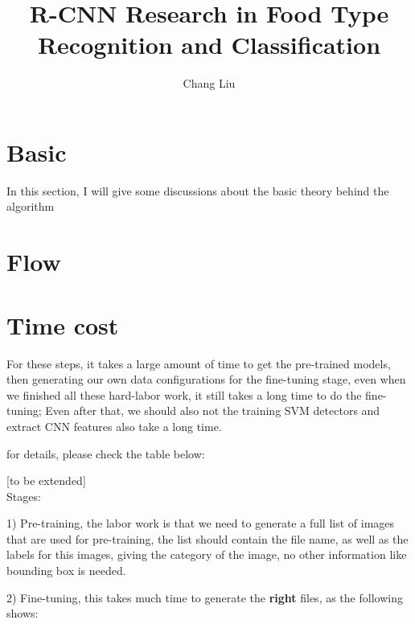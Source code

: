 \documentclass[a4]{article}
\title{R-CNN Research in Food Type Recognition and Classification}
\author{Chang Liu}
\begin{document}
\maketitle

\tableofcontents

\newpage



\section{Basic}

In this section, I will give some discussions about the basic theory behind the algorithm 


\section{Flow}



\section{Time cost}
For these steps, it takes a large amount of time to get the pre-trained models, then generating our own data configurations for the fine-tuning stage, even when we finished all these hard-labor work, it still takes a long time to do the fine-tuning; Even after that, we should also not the training SVM detectors and extract CNN features also take a long time.

for details, please check the table below:

[to be extended]
~\\

Stages:

1) Pre-training, the labor work is that we need to generate a full list of images that are used for pre-training, the list should contain the file name, as well as the labels for this images, giving the category of the image, no other information like bounding box is needed.

2) Fine-tuning, this takes much time to generate the \textbf{right} files, as the following shows:
\end{document}
